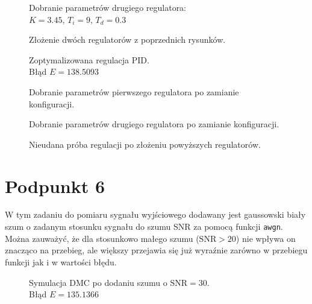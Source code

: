 \begin{figure}[ht]
	\centering
	
	\caption{Dobranie parametrów drugiego regulatora:\\
		$ K=\num{3,45} $, $ T_i=\num{9} $, $ T_d=\num{0,3} $}
	\label{Z5e}
\end{figure}

\begin{figure}[ht]
	\centering
	
	\caption{Złożenie dwóch regulatorów z poprzednich rysunków.}
	\label{Z5f}
\end{figure}

\begin{figure}[ht]
	\centering
	
	\caption{Zoptymalizowana regulacja PID.\\Błąd $ E=138.5093 $}
	\label{Z5g}
\end{figure}

\begin{figure}[ht]
	\centering
	
	\caption{Dobranie parametrów pierwszego regulatora po zamianie konfiguracji.}
	\label{Z5h}
\end{figure}

\begin{figure}[ht]
	\centering
	
	\caption{Dobranie parametrów drugiego regulatora po zamianie konfiguracji.}
	\label{Z5i}
\end{figure}

\begin{figure}[ht]
	\centering
	
	\caption{Nieudana próba regulacji po złożeniu powyższych regulatorów.}
	\label{Z5j}
\end{figure}


\chapter{Podpunkt 6}
W tym zadaniu do pomiaru sygnału wyjściowego dodawany jest gaussowski biały szum o zadanym stosunku sygnału do szumu SNR za pomocą funkcji \verb|awgn|. Można zauważyć, że dla stosunkowo małego szumu ($ \mathrm{SNR}>20 $) nie wpływa on znacząco na przebieg, ale większy przejawia się już wyraźnie zarówno w przebiegu funkcji jak i w wartości błędu. 

\begin{figure}[ht]
\centering

\caption{Symulacja DMC po dodaniu szumu o $ \mathrm{SNR}=30 $.\\Błąd $ E = \num{135,1366} $}
\label{Z6a}
\end{figure}

